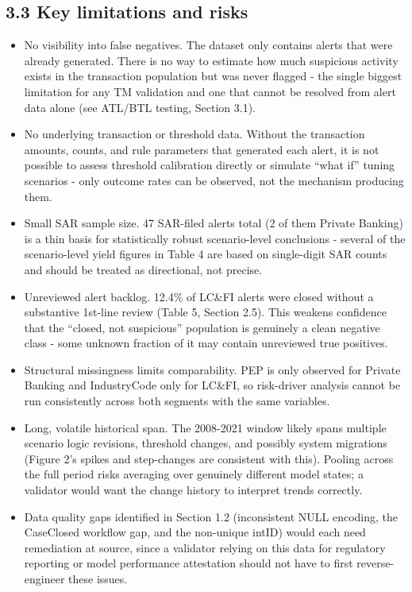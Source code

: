 \documentclass[
]{article}
\begin{document}
\subsection{3.3 Key limitations and
risks}\label{key-limitations-and-risks}

\begin{itemize}
\item
  No visibility into false negatives. The dataset only contains alerts
  that were already generated. There is no way to estimate how much
  suspicious activity exists in the transaction population but was never
  flagged - the single biggest limitation for any TM validation and one
  that cannot be resolved from alert data alone (see ATL/BTL testing,
  Section 3.1).
\item
  No underlying transaction or threshold data. Without the transaction
  amounts, counts, and rule parameters that generated each alert, it is
  not possible to assess threshold calibration directly or simulate
  ``what if'' tuning scenarios - only outcome rates can be observed, not
  the mechanism producing them.
\item
  Small SAR sample size. 47 SAR-filed alerts total (2 of them Private
  Banking) is a thin basis for statistically robust scenario-level
  conclusions - several of the scenario-level yield figures in Table 4
  are based on single-digit SAR counts and should be treated as
  directional, not precise.
\item
  Unreviewed alert backlog. 12.4\% of LC\&FI alerts were closed without
  a substantive 1st-line review (Table 5, Section 2.5). This weakens
  confidence that the ``closed, not suspicious'' population is genuinely
  a clean negative class - some unknown fraction of it may contain
  unreviewed true positives.
\item
  Structural missingness limits comparability. PEP is only observed for
  Private Banking and IndustryCode only for LC\&FI, so risk-driver
  analysis cannot be run consistently across both segments with the same
  variables.
\item
  Long, volatile historical span. The 2008-2021 window likely spans
  multiple scenario logic revisions, threshold changes, and possibly
  system migrations (Figure 2's spikes and step-changes are consistent
  with this). Pooling across the full period risks averaging over
  genuinely different model states; a validator would want the change
  history to interpret trends correctly.
\item
  Data quality gaps identified in Section 1.2 (inconsistent NULL
  encoding, the CaseClosed workflow gap, and the non-unique intID) would
  each need remediation at source, since a validator relying on this
  data for regulatory reporting or model performance attestation should
  not have to first reverse-engineer these issues.
\end{itemize}
\end{document}
